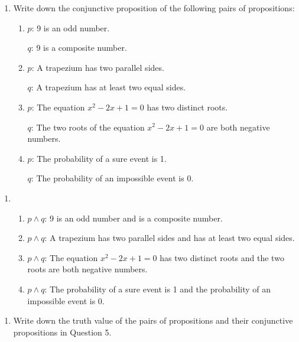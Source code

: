 \documentclass{report}
\begin{document}
\vspace{0.5cm}
\begin{enumerate}[label=\textbf{Example \arabic*}, leftmargin=*, start=5]
    \item Write down the conjunctive proposition of the following pairs of propositions:
          \begin{enumerate}[label=(\alph*), leftmargin=*]
              \item $p$: 9 is an odd number.

                    $q$: 9 is a composite number.

              \item $p$: A trapezium has two parallel sides.

                    $q$: A trapezium has at least two equal sides.

              \item $p$: The equation $x^2 - 2x + 1 = 0$ has two distinct roots.

                    $q$: The two roots of the equation $x^2 - 2x + 1 = 0$ are both negative numbers.

              \item $p$: The probability of a sure event is 1.

                    $q$: The probability of an impossible event is 0.
          \end{enumerate}
\end{enumerate}
\begin{enumerate}[label=\textbf{Sol.}, leftmargin=*]
    \item \begin{enumerate}[label=, leftmargin=*]
              \item $p \land q$: 9 is an odd number and is a composite number.
              \item $p \land q$: A trapezium has two parallel sides and has at least two equal sides.
              \item $p \land q$: The equation $x^2 - 2x + 1 = 0$ has two distinct roots and the two roots are both negative numbers.
              \item $p \land q$: The probability of a sure event is 1 and the probability of an impossible event is 0.
          \end{enumerate}
\end{enumerate}
\vspace{0.1cm}
\begin{enumerate}[label=\textbf{Example \arabic*}, leftmargin=*, start=6]
    \item Write down the truth value of the pairs of propositions and their conjunctive
          propositions in Question 5.
\end{enumerate}
\end{document}
